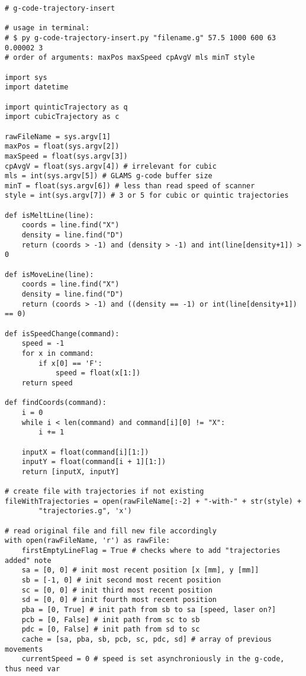 \begin{verbatim}
# g-code-trajectory-insert

# usage in terminal: 
# $ py g-code-trajectory-insert.py "filename.g" 57.5 1000 600 63 0.00002 3
# order of arguments: maxPos maxSpeed cpAvgV mls minT style

import sys
import datetime

import quinticTrajectory as q
import cubicTrajectory as c

rawFileName = sys.argv[1]
maxPos = float(sys.argv[2])
maxSpeed = float(sys.argv[3])
cpAvgV = float(sys.argv[4]) # irrelevant for cubic
mls = int(sys.argv[5]) # GLAMS g-code buffer size
minT = float(sys.argv[6]) # less than read speed of scanner
style = int(sys.argv[7]) # 3 or 5 for cubic or quintic trajectories

def isMeltLine(line):
    coords = line.find("X")
    density = line.find("D")
    return (coords > -1) and (density > -1) and int(line[density+1]) > 0

def isMoveLine(line):
    coords = line.find("X")
    density = line.find("D")
    return (coords > -1) and ((density == -1) or int(line[density+1]) == 0)

def isSpeedChange(command):
    speed = -1
    for x in command:
        if x[0] == 'F':
            speed = float(x[1:])
    return speed

def findCoords(command):
    i = 0
    while i < len(command) and command[i][0] != "X":
        i += 1

    inputX = float(command[i][1:])
    inputY = float(command[i + 1][1:])
    return [inputX, inputY]

# create file with trajectories if not existing
fileWithTrajectories = open(rawFileName[:-2] + "-with-" + str(style) +
        "trajectories.g", 'x')

# read original file and fill new file accordingly
with open(rawFileName, 'r') as rawFile:
    firstEmptyLineFlag = True # checks where to add "trajectories added" note
    sa = [0, 0] # init most recent position [x [mm], y [mm]]
    sb = [-1, 0] # init second most recent position
    sc = [0, 0] # init third most recent position
    sd = [0, 0] # init fourth most recent position 
    pba = [0, True] # init path from sb to sa [speed, laser on?]
    pcb = [0, False] # init path from sc to sb
    pdc = [0, False] # init path from sd to sc
    cache = [sa, pba, sb, pcb, sc, pdc, sd] # array of previous movements
    currentSpeed = 0 # speed is set asynchroniously in the g-code, thus need var


\end{verbatim}
